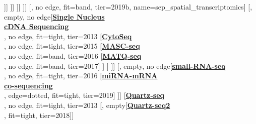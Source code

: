 \documentclass[12pt, a4]{article}
\begin{document}
\begin{center}
\begin{forest}
		[, empty[\href{https://www.nature.com/articles/nprot.2014.191}{\textbf{FISSEQ\textsuperscript{\large{\textmu}}}}\\\citealt{lee2015}, fit=band, tier=2015
			[, empty, no edge[\href{https://currentprotocols.onlinelibrary.wiley.com/doi/pdf/10.1002/cpmb.44}{\textbf{subRNA-seq\textsuperscript{\large{\textmu}}}}\\\citealt{mayer2017}, no edge, fit=band, tier=2017
				[, empty, no edge[\href{https://science.sciencemag.org/content/361/6400/eaat5691}{\textbf{STARmap\textsuperscript{\large{\textmu}}}}\\\citealt{wang2018b}, no edge, fit=band, name=starmap, tier=2018
					[\href{https://science.sciencemag.org/content/363/6434/1463}{\textbf{Slide-seq\textsuperscript{\large{\textmu}}}}\\\citealt{rodriques2019}, no edge, fit=band, tier=2019]
				]]
			]]
		]]
	]]
	[, no edge, fit=band, tier=2019b, name=sep_spatial_transcriptomics]
	[, empty, no edge[\href{https://doi.org/10.1073/pnas.1319700110}{\textbf{Single Nucleus}}\\\href{https://doi.org/10.1073/pnas.1319700110}{\textbf{cDNA Sequencing}}\\\citealt{grindberg2013}, no edge, fit=tight, tier=2013
		[\href{https://science.sciencemag.org/content/347/6222/1258367.figures-only}{\textbf{CytoSeq}}\\\citealt{fan2015a}, no edge, fit=tight, tier=2015
			[\href{https://www.nature.com/articles/ncomms13182}{\textbf{MASC-seq}}\\\citealt{vickovic2016}, no edge, fit=band, tier=2016
				[\href{https://doi.org/10.1038/nmeth.4145}{\textbf{MATQ-seq}}\\\citealt{sheng2017}, no edge, fit=band, tier=2017]
			]
		]
	]]
	[, empty, no edge[\href{https://doi.org/10.1038/nbt.3701}{\textbf{small-RNA-seq}}\\\citealt{faridani2016}, no edge, fit=tight, tier=2016
		[\href{https://doi.org/10.1038/s41467-018-07981-6}{\textbf{miRNA-mRNA}}\\\href{https://doi.org/10.1038/s41467-018-07981-6}{\textbf{co-sequencing}}\\\citealt{wang2019}, edge=dotted, fit=tight, tier=2019]
	]]
	[\href{https://genomebiology.biomedcentral.com/articles/10.1186/gb-2013-14-4-r31}{\textbf{Quartz-seq}}\\\citealt{sasagawa2013}, no edge, fit=tight, tier=2013
		[, empty[\href{https://genomebiology.biomedcentral.com/articles/10.1186/s13059-018-1407-3}{\textbf{Quartz-seq2}}\\\citealt{sasagawa2018}, fit=tight, tier=2018]]

\end{forest}
\end{center}
\end{document}
